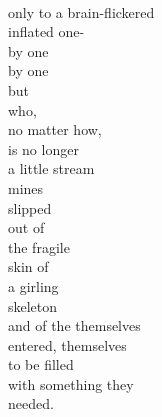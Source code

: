 \documentclass[smalldemyvopaper,11pt,twoside,onecolumn,openright,extrafontsizes]{memoir}
\begin{document}
\\only to a brain-flickered
\\inflated one-
\\by one
\\by one
\\but
\\who,
\\no matter how,
\\is no longer
\\a little stream
\\mines
\\slipped
\\out of
\\the fragile
\\skin of
\\a girling
\\skeleton
\\and of the themselves
\\entered, themselves
\\to be filled
\\with something they
\\needed.
\end{document}
